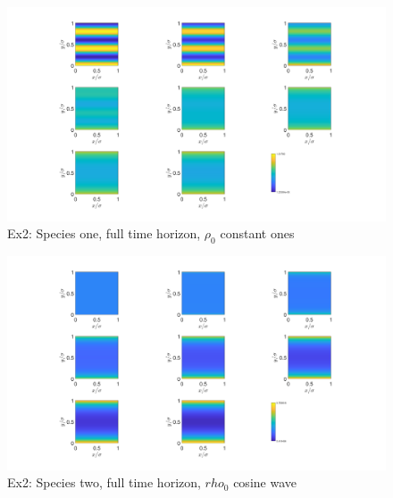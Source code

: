 \documentclass[11pt, a4paper]{article}
\theoremstyle{definition}
\begin{document}
	\begin{figure}[h]
		\centering
		\includegraphics[scale=0.25]{Weird3.png}
		\caption{Ex2: Species one, full time horizon, $\rho_0$ constant ones} 
		\label{F2c}
	\end{figure}
	\begin{figure}[h]
		\centering
		\includegraphics[scale=0.25]{Weird4.png}
		\caption{Ex2: Species two, full time horizon, $rho_0$ cosine wave} 
		\label{F2d}
	\end{figure}
\end{document}
